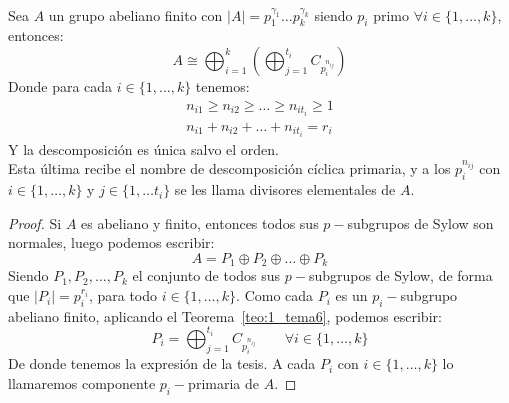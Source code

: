 \begin{teo}\label{teo:2_tema6}\ \\
    Sea $A$ un grupo abeliano finito con $|A| = p_1^{\gamma_1}\ldots p_k^{\gamma_k}$ siendo $p_i$ primo $\forall i \in \{1,\ldots,k\}$, entonces:
    \begin{equation*}
        A \cong \bigoplus_{i=1}^k \left(\bigoplus_{j=1}^{t_i} C_{p_i^{n_{ij}}}\right)
    \end{equation*}
    Donde para cada $i \in \{1,\ldots,k\}$ tenemos:
    \begin{align*}
        n_{i1} \geq n_{i2} \geq \ldots \geq n_{it_{i}} \geq 1 \\
        n_{i1} + n_{i2} + \ldots + n_{it_{i}} = r_i
    \end{align*}
    Y la descomposición es única salvo el orden.\\

    \noindent
    Esta última recibe el nombre de descomposición cíclica primaria, y a los $p_i^{n_{ij}}$ con $i \in \{1,\ldots,k\}$ y $j \in \{1,\ldots t_i\}$ se les llama divisores elementales de $A$.\newline
    \begin{proof}
        Si $A$ es abeliano y finito, entonces todos sus $p-$subgrupos de Sylow son normales, luego podemos escribir:
        \begin{equation*}
            A = P_1 \oplus P_2 \oplus \ldots \oplus P_k
        \end{equation*}
        Siendo ${P_1, P_2, \ldots, P_k}$ el conjunto de todos sus $p-$subgrupos de Sylow, de forma que $|P_i| = p_i^{r_i}$, para todo $i \in \{1,\ldots,k\}$. Como cada $P_i$ es un $p_i-$subgrupo abeliano finito, aplicando el Teorema~\ref{teo:1_tema6}, podemos escribir:
        \begin{equation*}
            P_i = \bigoplus_{j=1}^{t_i} C_{p_i^{n_{ij}}} \qquad \forall i \in \{1,\ldots,k\}
        \end{equation*}
        De donde tenemos la expresión de la tesis.\newline
        A cada $P_i$ con $i \in \{1,\ldots,k\}$ lo llamaremos componente $p_i-$primaria de $A$.
    \end{proof}
\end{teo}

